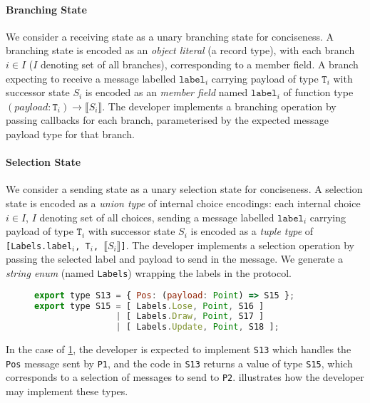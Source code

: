 \paragraph{Branching State}
We consider a receiving state as a unary branching state for conciseness.
A branching state is encoded as an \textit{object literal}
\cite{TypeScriptSpec} (a record type), with each branch $i \in I$ ($I$ denoting set of all
branches), corresponding to a member field.
A branch expecting to receive a message labelled $\texttt{label}_i$ carrying
payload of type $\texttt{T}_i$ with successor state $S_i$ is encoded as an
\textit{member field} named $\texttt{label}_i$ of function type
$(payload:\texttt{T}_i) \to \llbracket S_i \rrbracket$.
The developer implements a branching operation by passing callbacks for each
branch, parameterised by the expected message payload type for that branch.

\paragraph{Selection State}
We consider a sending state as a unary selection state for conciseness.
A selection state is encoded as a \textit{union type}
\cite{TypeScriptSpec} of internal choice encodings: each internal choice $i \in
I$, $I$ denoting set of all choices, sending a message labelled
$\texttt{label}_i$ carrying payload of type $\texttt{T}_i$ with successor state
$S_i$ is encoded as a \textit{tuple type} of \texttt{[Labels.label$_i$, T$_i$,
  $\llbracket S_i \rrbracket$]}.
The developer implements a selection operation by passing the selected label
and payload to send in the message.
We generate a \textit{string enum} (named \texttt{Labels}) wrapping the labels
in the protocol.

\begin{figure}[ht]
\begin{lstlisting}[language=JavaScript]
export type S13 = { Pos: (payload: Point) => S15 };
export type S15 = [ Labels.Lose, Point, S16 ]
                | [ Labels.Draw, Point, S17 ]
                | [ Labels.Update, Point, S18 ];
\end{lstlisting}
\label{lst:svr}
\end{figure}

In the case of \cref{lst:svr}, the developer is expected to implement
\texttt{S13} which handles the \texttt{Pos} message sent by \texttt{P1},
and the code in \texttt{S13} returns a value of type \texttt{S15}, which
corresponds to a selection of messages to send to \texttt{P2}. 
illustrates how the developer may implement these types.


